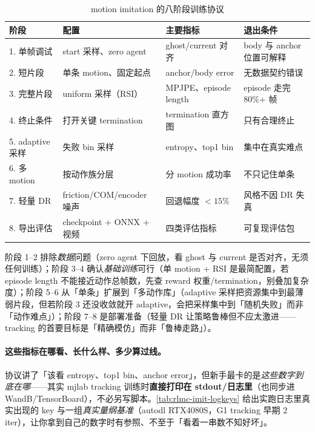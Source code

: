 \begin{table}[ht]
\centering
\small
\caption{motion imitation 的八阶段训练协议}
\label{tab:rlmc-imit-protocol}
\begin{tabular}{@{}llll@{}}
\toprule
阶段 & 配置 & 主要指标 & 退出条件 \\
\midrule
1. 单帧调试 & start 采样、zero agent & ghost/current 对齐 & body 与 anchor 位置可解释 \\
2. 短片段 & 单条 motion、固定起点 & anchor/body error & 无数据契约错误 \\
3. 完整片段 & uniform 采样（RSI） & MPJPE、episode length & episode 走完 80\%+ 帧 \\
4. 终止条件 & 打开关键 termination & termination 直方图 & 只有合理终止 \\
5. adaptive 采样 & 失败 bin 采样 & entropy、top1 bin & 集中在真实难点 \\
6. 多 motion & 按动作族分层 & 分 motion 成功率 & 不只记住单条 \\
7. 轻量 DR & friction/COM/encoder 噪声 & 回退幅度 $<15\%$ & 风格不因 DR 失真 \\
8. 导出评估 & checkpoint + ONNX + 视频 & 四类评估指标 & 可复现评估包 \\
\bottomrule
\end{tabular}
\end{table}

阶段 1--2 排除\emph{数据}问题（zero agent 下回放，看 ghost 与 current 是否对齐，无须任何训练）；阶段 3--4 确认\emph{基础训练}可行（单 motion + RSI 是最简配置，若 episode length 不能接近动作总帧数，先查 reward 权重/termination，别叠加复杂度）；阶段 5--6 从「单条」扩展到「多动作库」（adaptive 采样把资源集中到最薄弱片段，但若阶段 3 还没收敛就开 adaptive，会把采样集中到「随机失败」而非「动作难点」）；阶段 7--8 是部署准备（轻量 DR 让策略鲁棒但不应太激进——tracking 的首要目标是「精确模仿」而非「鲁棒走路」）。

\paragraph{这些指标在哪看、长什么样、多少算过线。}协议讲了「该看 entropy、top1 bin、anchor error」，但新手最卡的是\emph{这些数字到底在哪}——其实 mjlab tracking 训练时\textbf{直接打印在 stdout/日志里}（也同步进 WandB/TensorBoard），不必另写脚本。\cref{tab:rlmc-imit-logkeys} 给出实跑日志里真实出现的 key 与一组\emph{真实量纲基准}（autodl RTX4080S，G1 tracking 早期 2 iter），让你拿到自己的数字时有参照、不至于「看着一串数不知好坏」。

